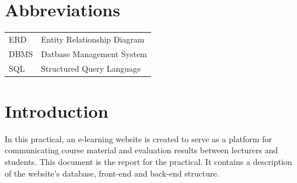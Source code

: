 \documentclass[a4paper,12pt]{article}
\numberwithin{equation}{section} %
\numberwithin{figure}{section}
\begin{document}
\thispagestyle{empty} 	%

\pagebreak


\pagebreak


\tableofcontents 



\listoffigures

\section*{\Large{Abbreviations}}
\begin{center}
\begin{tabular}{l l}
ERD & Entity Relationship Diagram\\
DBMS & Datbase Management System\\
SQL & Structured Query Language\\
\end{tabular}
\end{center}


\pagebreak


\section{Introduction}
In this practical, an e-learning website is created to serve as a platform for communicating course material and evaluation results between lecturers and students. This document is the report for the practical. It contains a description of the website's database, front-end and back-end structure.
\end{document}
